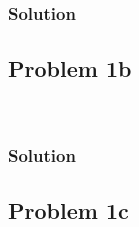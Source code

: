 \documentclass[conf]{new-aiaa}
\begin{document}

\subsubsection*{Solution} 



\subsection*{Problem 1b} 

\begin{center}
	 \\
\end{center}


\subsubsection*{Solution} 




\subsection*{Problem 1c} 

\begin{center}
	 \\
\end{center}
\end{document}

